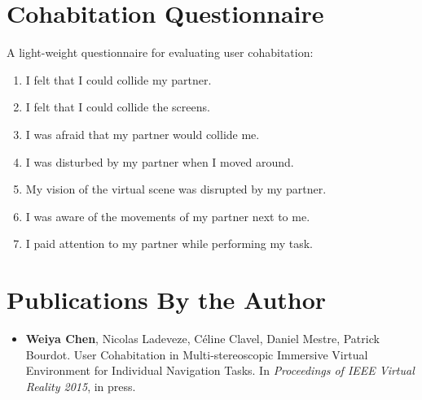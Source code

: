 \begin{appendices}
\chapter{Cohabitation Questionnaire}
\label{appendix:cohab_q}
A light-weight questionnaire for evaluating user cohabitation:
\begin{enumerate}
	\item I felt that I could collide my partner.
	\item I felt that I could collide the screens.
	\item I was afraid that my partner would collide me.
	\item I was disturbed by my partner when I moved around.
	\item My vision of the virtual scene was disrupted by my partner.
	\item I was aware of the movements of my partner next to me.
	\item I paid attention to my partner while performing my task.
\end{enumerate}

\chapter{Publications By the Author}

\begin{itemize}
\item \textbf{Weiya Chen}, Nicolas Ladeveze, C\'eline Clavel, Daniel Mestre, Patrick Bourdot. User Cohabitation in Multi-stereoscopic Immersive Virtual Environment for Individual Navigation Tasks. In \emph{Proceedings of IEEE Virtual Reality 2015}, in press.
\end{itemize}

\end{appendices}